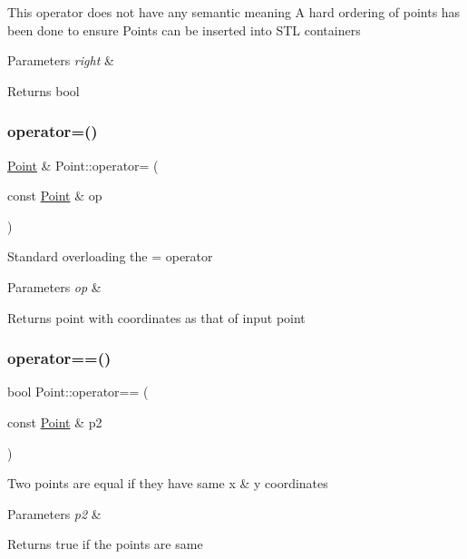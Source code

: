 This operator does not have any semantic meaning A hard ordering of points has been done to ensure Points can be inserted into S\+TL containers 
\begin{DoxyParams}{Parameters}
{\em right} & \\
\hline
\end{DoxyParams}
\begin{DoxyReturn}{Returns}
bool 
\end{DoxyReturn}
\mbox{\label{classPoint_a2e142edc132377fdc6873f6549daab2d}} 
\subsubsection{\texorpdfstring{operator=()}{operator=()}}
{\footnotesize\ttfamily \hyperlink{classPoint}{Point} \& Point\+::operator= (\begin{DoxyParamCaption}\item[{const \hyperlink{classPoint}{Point} \&}]{op }\end{DoxyParamCaption})}

Standard overloading the = operator 
\begin{DoxyParams}{Parameters}
{\em op} & \\
\hline
\end{DoxyParams}
\begin{DoxyReturn}{Returns}
point with coordinates as that of input point 
\end{DoxyReturn}
\mbox{\label{classPoint_ac7bc64b9a683d5fb35780c739779f2fc}} 
\subsubsection{\texorpdfstring{operator==()}{operator==()}}
{\footnotesize\ttfamily bool Point\+::operator== (\begin{DoxyParamCaption}\item[{const \hyperlink{classPoint}{Point} \&}]{p2 }\end{DoxyParamCaption})}

Two points are equal if they have same x \& y coordinates 
\begin{DoxyParams}{Parameters}
{\em p2} & \\
\hline
\end{DoxyParams}
\begin{DoxyReturn}{Returns}
true if the points are same 
\end{DoxyReturn}


